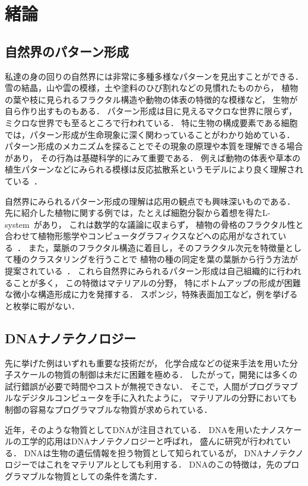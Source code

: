 \chapter{緒論}

\section{自然界のパターン形成}
私達の身の回りの自然界には非常に多種多様なパターンを見出すことができる．
雪の結晶，山や雲の模様，土や塗料のひび割れなどの見慣れたものから，
植物の葉や枝に見られるフラクタル構造や動物の体表の特徴的な模様など，
生物が自ら作り出すものもある．
パターン形成は目に見えるマクロな世界に限らず，
ミクロな世界でも至るところで行われている．
特に生物の構成要素である細胞では，パターン形成が生命現象に深く関わっていることがわかり始めている．
パターン形成のメカニズムを探ることでその現象の原理や本質を理解できる場合があり，
その行為は基礎科学的にみて重要である．
例えば動物の体表や草本の植生パターンなどにみられる模様は反応拡散系というモデルにより良く理解されている~\cite{turing1990chemical}．

自然界にみられるパターン形成の理解は応用の観点でも興味深いものである．
先に紹介した植物に関する例では，たとえば細胞分裂から着想を得たL-system~\cite{lindenmayer1968mathematical}があり，
これは数学的な議論に収まらず，
植物の骨格のフラクタル性と合わせて植物形態学やコンピュータグラフィクスなどへの応用がなされている~\cite{aono1984botanical}．
また，葉脈のフラクタル構造に着目し，そのフラクタル次元を特徴量として種のクラスタリングを行うことで
植物の種の同定を葉の葉脈から行う方法が提案されている~\cite{bruno2008fractal}．
これら自然界にみられるパターン形成は自己組織的に行われることが多く，
この特徴はマテリアルの分野，
特にボトムアップの形成が困難な微小な構造形成に力を発揮する．
スポンジ，特殊表面加工など，例を挙げると枚挙に暇がない．
%


\section{DNAナノテクノロジー}
先に挙げた例はいずれも重要な技術だが，
化学合成などの従来手法を用いた分子スケールの物質の制御は未だに困難を極める．
したがって，開発には多くの試行錯誤が必要で時間やコストが無視できない．
そこで，人間がプログラマブルなデジタルコンピュータを手に入れたように，
マテリアルの分野においても制御の容易なプログラマブルな物質が求められている．

近年，そのような物質としてDNAが注目されている．
DNAを用いたナノスケールの工学的応用はDNAナノテクノロジーと呼ばれ，
盛んに研究が行われている．
DNAは生物の遺伝情報を担う物質として知られているが，
DNAナノテクノロジーではこれをマテリアルとしても利用する．
DNAのこの特徴は，先のプログラマブルな物質としての条件を満たす．

